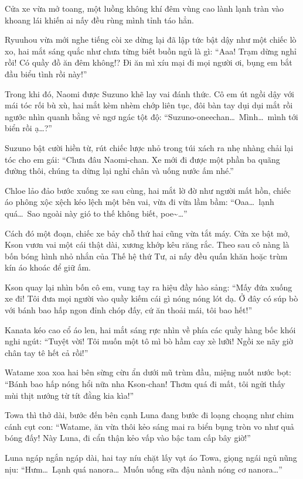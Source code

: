 \documentclass[../main.tex]{subfiles}
\begin{document}
Cửa xe vừa mở toang, một luồng không khí đêm vùng cao lành lạnh tràn vào khoang lái khiến ai nấy đều rùng mình tỉnh táo hẳn.

Ryuuhou vừa mới nghe tiếng còi xe dừng lại đã lập tức bật dậy như một chiếc lò xo, hai mắt sáng quắc như chưa từng biết buồn ngủ là gì: ``Aaa! Trạm dừng nghỉ rồi! Có quầy đồ ăn đêm không!? Đi ăn mì xíu mại đi mọi người ơi, bụng em bắt đầu biểu tình rồi này!''

Trong khi đó, Naomi được Suzuno khẽ lay vai đánh thức. Cô em út ngồi dậy với mái tóc rối bù xù, hai mắt kèm nhèm chớp liên tục, đôi bàn tay dụi dụi mắt rồi ngước nhìn quanh bằng vẻ ngơ ngác tột độ: ``Suzuno-oneechan\dots\ Mình\dots\ mình tới biển rồi ạ\dots?''

Suzuno bật cười hiền từ, rút chiếc lược nhỏ trong túi xách ra nhẹ nhàng chải lại tóc cho em gái: ``Chưa đâu Naomi-chan. Xe mới đi được một phần ba quãng đường thôi, chúng ta dừng lại nghỉ chân và uống nước ấm nhé.''

Chloe lảo đảo bước xuống xe sau cùng, hai mắt lờ đờ như người mất hồn, chiếc áo phông xộc xệch kéo lệch một bên vai, vừa đi vừa lầm bầm: ``Oaa\dots\ lạnh quá\dots\ Sao ngoài này gió to thế không biết, poe\~{}\dots''

Cách đó một đoạn, chiếc xe bảy chỗ thứ hai cũng vừa tắt máy. Cửa xe bật mở, Kson vươn vai một cái thật dài, xương khớp kêu răng rắc. Theo sau cô nàng là bốn bóng hình nhỏ nhắn của Thế hệ thứ Tư, ai nấy đều quấn khăn hoặc trùm kín áo khoác để giữ ấm.

Kson quay lại nhìn bốn cô em, vung tay ra hiệu đầy hào sảng: ``Mấy đứa xuống xe đi! Tôi đưa mọi người vào quầy kiếm cái gì nóng nóng lót dạ. Ở đây có súp bò với bánh bao hấp ngon đỉnh chóp đấy, cứ ăn thoải mái, tôi bao hết!''

Kanata kéo cao cổ áo len, hai mắt sáng rực nhìn về phía các quầy hàng bốc khói nghi ngút: ``Tuyệt vời! Tôi muốn một tô mì bò hầm cay xè lưỡi! Ngồi xe nãy giờ chân tay tê hết cả rồi!''

Watame xoa xoa hai bên sừng cừu ẩn dưới mũ trùm đầu, miệng nuốt nước bọt: ``Bánh bao hấp nóng hổi nữa nha Kson-chan! Thơm quá đi mất, tôi ngửi thấy mùi thịt nướng từ tít đằng kia kìa!''

Towa thì thở dài, bước đến bên cạnh Luna đang bước đi loạng choạng như chim cánh cụt con: ``Watame, ăn vừa thôi kẻo sáng mai ra biển bụng tròn vo như quả bóng đấy! Này Luna, đi cẩn thận kẻo vấp vào bậc tam cấp bây giờ!''

Luna ngáp ngắn ngáp dài, hai tay níu chặt lấy vạt áo Towa, giọng ngái ngủ nũng nịu: ``Hưm\dots\ Lạnh quá nanora\dots\ Muốn uống sữa đậu nành nóng cơ nanora\dots''
\end{document}

